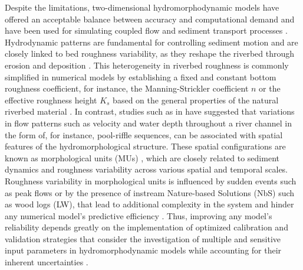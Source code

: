 \documentclass[draft,linenumbers,onecolumn]{agujournal2019} %
\begin{document}
Despite the limitations, two-dimensional hydromorphodynamic models have offered an acceptable balance between accuracy and computational demand and have been used for simulating coupled flow and sediment transport processes \cite{papanicolaou2008sediment}. Hydrodynamic patterns are fundamental for controlling sediment motion and are closely linked to bed roughness variability, as they reshape the riverbed through erosion and deposition \cite{lokin2023effect,mishra2020alluvial}. This heterogeneity in riverbed roughness is commonly simplified in numerical models by establishing a fixed and constant bottom roughness coefficient, for instance, the Manning-Strickler coefficient \( n \) or the effective roughness height \( K_s \) based on the general properties of the natural riverbed material \cite{chow1959openchannel}. In contrast, studies such as in  have suggested that variations in flow patterns such as velocity and water depth throughout a river channel in the form of, for instance, pool-riffle sequences, can be associated with spatial features of the hydromorphological structure. These spatial configurations are known as morphological units (MUs) \cite{wadeson1994geomorphological,wyrick2014geospatial}, which are closely related to sediment dynamics and roughness variability across various spatial and temporal scales. Roughness variability in morphological units is influenced by sudden events such as peak flows or by the presence of instream Nature-based Solutions (NbS) such as wood logs (LW), that lead to additional complexity in the system and hinder any numerical model's predictive efficiency \cite{bunte2001samplinga,schalko2024flow}. Thus, improving any model's reliability depends greatly on the implementation of optimized calibration and validation strategies that consider the investigation of multiple and sensitive input parameters in hydromorphodynamic models while accounting for their inherent uncertainties \cite{guerrero2012calibration,li2011twodimensional,bel2020calibration,scolari2025hydromorphodynamic}.
\end{document}
